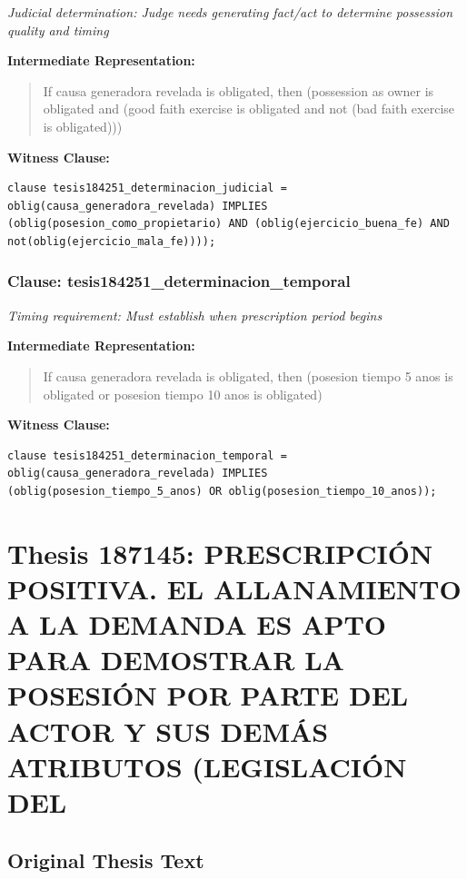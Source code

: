 \documentclass[11pt,a4paper]{article}
\begin{document}
\textit{Judicial determination: Judge needs generating fact/act to determine possession quality and timing}

\textbf{Intermediate Representation:}

\begin{quote}
If causa generadora revelada is obligated, then (possession as owner is obligated and (good faith exercise is obligated and not (bad faith exercise is obligated)))
\end{quote}

\textbf{Witness Clause:}

\begin{lstlisting}[style=witnessstyle, language=Witness]
clause tesis184251_determinacion_judicial = oblig(causa_generadora_revelada) IMPLIES (oblig(posesion_como_propietario) AND (oblig(ejercicio_buena_fe) AND not(oblig(ejercicio_mala_fe))));
\end{lstlisting}

\subsubsection{Clause: tesis184251\_determinacion\_temporal}

\textit{Timing requirement: Must establish when prescription period begins}

\textbf{Intermediate Representation:}

\begin{quote}
If causa generadora revelada is obligated, then (posesion tiempo 5 anos is obligated or posesion tiempo 10 anos is obligated)
\end{quote}

\textbf{Witness Clause:}

\begin{lstlisting}[style=witnessstyle, language=Witness]
clause tesis184251_determinacion_temporal = oblig(causa_generadora_revelada) IMPLIES (oblig(posesion_tiempo_5_anos) OR oblig(posesion_tiempo_10_anos));
\end{lstlisting}

\newpage

\section{Thesis 187145: PRESCRIPCIÓN POSITIVA. EL ALLANAMIENTO A LA DEMANDA ES APTO PARA DEMOSTRAR LA POSESIÓN POR PARTE DEL ACTOR Y SUS DEMÁS ATRIBUTOS (LEGISLACIÓN DEL}
\label{thesis:187145}

\subsection{Original Thesis Text}
\end{document}
